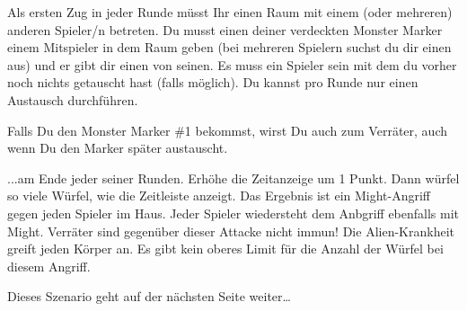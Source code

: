 
Als ersten Zug in jeder Runde müsst Ihr einen Raum mit einem (oder mehreren) anderen Spieler/n betreten. Du musst einen deiner verdeckten Monster Marker einem Mitspieler in dem Raum geben (bei mehreren Spielern suchst du dir einen aus) und er gibt dir einen von seinen. Es muss ein Spieler sein mit dem du vorher noch nichts getauscht hast (falls möglich). Du kannst pro Runde nur einen Austausch durchführen.

Falls Du den Monster Marker \#1 bekommst, wirst Du auch zum Verräter, auch wenn Du den Marker später austauscht.

...am Ende jeder seiner Runden. Erhöhe die Zeitanzeige um 1 Punkt.
Dann würfel so viele Würfel, wie die Zeitleiste anzeigt.
Das Ergebnis ist ein Might-Angriff gegen jeden Spieler im Haus.
Jeder Spieler wiedersteht dem Anbgriff ebenfalls mit Might.
Verräter sind gegenüber dieser Attacke nicht immun! Die Alien-Krankheit greift jeden Körper an.
Es gibt kein oberes Limit für die Anzahl der Würfel bei diesem Angriff.

\vspace{2cm}

Dieses Szenario geht auf der nächsten Seite weiter…


\newpage


